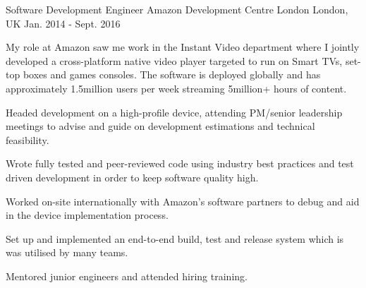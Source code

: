 \begin{cventries}
  \cventry
    {Software Development Engineer} %
    {Amazon Development Centre London} %
    {London, UK} %
    {Jan. 2014 - Sept. 2016} %
    {
      \begin{cventrysummary}
      My role at Amazon saw me work in the Instant Video department where I jointly
      developed a cross-platform native video player targeted to run on Smart TVs,
      set-top boxes and games consoles. The software is deployed globally and
      has approximately 1.5million users per week streaming 5million+ hours of
      content.
      \end{cventrysummary}
      \begin{cvitems} %
        \item {Headed development on a high-profile device, attending PM/senior leadership meetings to advise and guide on development estimations and technical feasibility.}
        \item {Wrote fully tested and peer-reviewed code using industry best practices and test driven development in order to keep software quality high.}
        \item {Worked on-site internationally with Amazon’s software partners to debug and aid in the device implementation process.}
        \item {Set up and implemented an end-to-end build, test and release system which is was utilised by many teams.}
        \item {Mentored junior engineers and attended hiring training.}
      \end{cvitems}
    }


\end{cventries}
